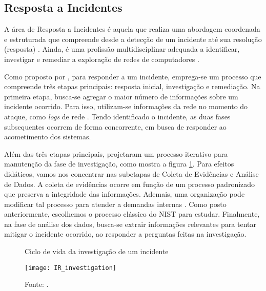     \subsection{Resposta a Incidentes} \label{cap1_ir}
    
    \hspace{1cm}
    A área de Resposta a Incidentes é aquela que realiza uma abordagem coordenada e estruturada que compreende desde a detecção de um incidente até sua resolução (resposta) \cite{luttgens2014}. Ainda, é uma profissão multidisciplinar adequada a identificar, investigar e remediar a exploração de redes de computadores \cite{roberts2016}.

    \vspace{4mm}

    \hspace{1cm}
    Como proposto por , para responder a um incidente, emprega-se um processo que compreende três etapas principais: resposta inicial, investigação e remediação. Na primeira etapa, busca-se agregar o maior número de informações sobre um incidente ocorrido. Para isso, utilizam-se informações da rede no momento do ataque, como \textit{logs} de rede \cite{luttgens2014}. Tendo identificado o incidente, as duas fases subsequentes ocorrem de forma concorrente, em busca de responder ao acometimento dos sistemas.
        
    \vspace{4mm}
    
    \hspace{1cm}
    Além das três etapas principais,  projetaram um processo iterativo para manutenção da fase de investigação, como mostra a figura \ref{IR_lifecycle}. Para efeitos didáticos, vamos nos concentrar nas subetapas de Coleta de Evidências e Análise de Dados. A coleta de evidências ocorre em função de um processo padronizado que preserva a integridade das informações. Ademais, uma organização pode modificar tal processo para atender a demandas internas \cite{luttgens2014}. Como posto anteriormente, escolhemos o processo clássico do NIST para estudar. Finalmente, na fase de análise dos dados, busca-se extrair informações relevantes para tentar mitigar o incidente ocorrido, ao responder a perguntas feitas na investigação.
    
    \begin{figure}[H]
    	\centering
    	\caption{Ciclo de vida da investigação de um incidente}
    	\texttt{[image: IR\_investigation]}
    	\caption*{Fonte: .}
    	\label{IR_lifecycle}
    \end{figure}
    
